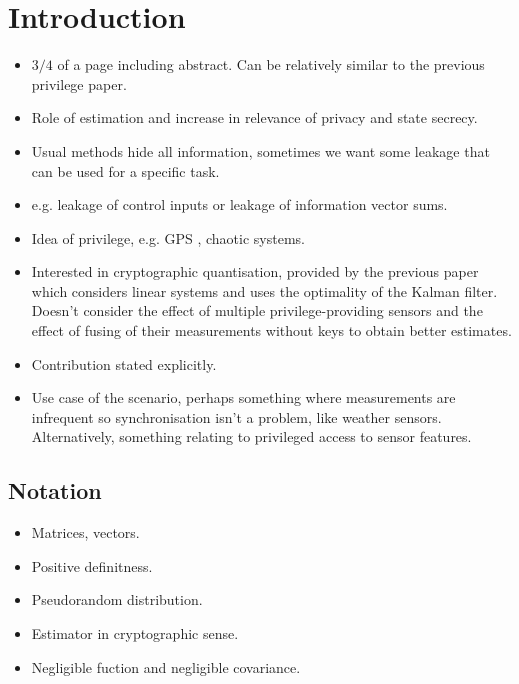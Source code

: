 \documentclass[conference]{IEEEtran}
\begin{document}
\section{Introduction}\label{sec:intro}
\begin{itemize}
  \item $3/4$ of a page including abstract. Can be relatively similar to the previous privilege paper.
  \item Role of estimation and increase in relevance of privacy and state secrecy.
  \item Usual methods hide all information, sometimes we want some leakage that can be used for a specific task.
  \item e.g. leakage of control inputs or leakage of information vector sums.
  \item Idea of privilege, e.g. GPS \cite{grovesPrinciplesGNSSInertial2015}, chaotic systems.
  \item Interested in cryptographic quantisation, provided by the previous paper which considers linear systems and uses the optimality of the Kalman filter. Doesn't consider the effect of multiple privilege-providing sensors and the effect of fusing of their measurements without keys to obtain better estimates. 
  \item Contribution stated explicitly.
  \item Use case of the scenario, perhaps something where measurements are infrequent so synchronisation isn't a problem, like weather sensors. Alternatively, something relating to privileged access to sensor features.
\end{itemize}

\subsection{Notation}\label{subsec:notation}
\begin{itemize}
  \item Matrices, vectors.
  \item Positive definitness.
  \item Pseudorandom distribution.
  \item Estimator in cryptographic sense.
  \item Negligible fuction and negligible covariance.
\end{itemize}

% 
%                                              
%                                              
%                                              
% 
\end{document}
